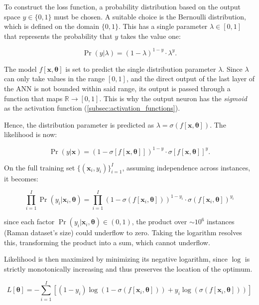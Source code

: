 To construct the loss function, a probability distribution based on the output space $y \in \{0,1\}$ must be chosen. A suitable choice is the Bernoulli distribution, which is defined on the domain $\{0,1\}$. This has a single parameter $\lambda \in [0,1]$ that represents the probability that $y$ takes the value one:

\begin{equation}
    \Pr(y|\lambda) = (1-\lambda)^{1-y} \cdot \lambda^y.
\end{equation}

The model $f[\mathbf{x}, \boldsymbol{\theta}]$ is set to predict the single distribution parameter $\lambda$. Since $\lambda$ can only take values in the range $[0,1]$, and the direct output of the last layer of the ANN is not bounded within said range, its output is passed through a function that maps $\mathbb{R} \rightarrow [0,1]$. This is why the output neuron has the \textit{sigmoid} as the activation function (\cref{subsec:activation_functions}).

Hence, the distribution parameter is predicted as $\lambda = \sigma(f[\mathbf{x}, \boldsymbol{\theta}])$. The likelihood is now:

\begin{equation}
    \Pr(y|\mathbf{x}) = (1 - \sigma[f[\mathbf{x}, \boldsymbol{\theta}]])^{1-y} \cdot \sigma[f[\mathbf{x}, \boldsymbol{\theta}]]^y.
\end{equation}

On the full training set $\{(\mathbf{x}_i, y_i)\}_{i=1}^{I}$, assuming independence across instances, it becomes:

\begin{equation}
    \prod_{i=1}^{I} \Pr(y_i | \mathbf{x}_i, 
    \boldsymbol{\theta}) = \prod_{i=1}^{I} \left(1 - \sigma(f[\mathbf{x}_i, 
    \boldsymbol{\theta}])\right)^{1-y_i} \cdot \sigma(f[\mathbf{x}_i, 
    \boldsymbol{\theta}])^{y_i}
\end{equation}

since each factor $\Pr(y_i|\mathbf{x}_i, \boldsymbol{\theta}) \in (0,1)$, the product over $\sim10^6$ instances (Raman dataset's size) could underflow to zero. Taking the logarithm resolves this, transforming the product into a sum, which cannot underflow.

Likelihood is then maximized by minimizing its negative logarithm, since $\log$ is strictly monotonically increasing and thus preserves the location of the optimum.

\begin{equation}
    L[\boldsymbol{\theta}] = 
    -\sum_{i=1}^{I} \left[(1-y_i)\log\left(1 - \sigma(f[\mathbf{x}_i, 
    \boldsymbol{\theta}])\right) + y_i \log\left(\sigma(f[\mathbf{x}_i, 
    \boldsymbol{\theta}])\right)\right]
\end{equation}

